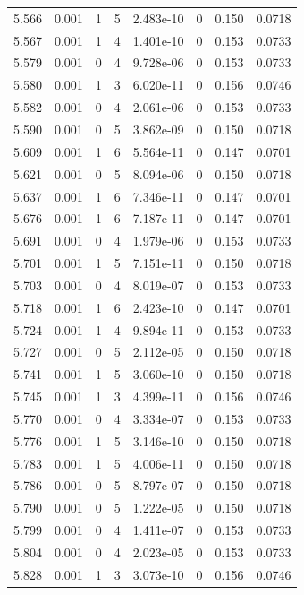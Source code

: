 \documentclass[preview]{standalone}
\begin{document}
{{{{{\begin{tabular}{L{1.2cm}C{1.2cm} C{0.3cm}C{0.5cm} C{1.4cm}C{1.4cm} C{1.4cm}C{1.4cm}}
  5.566  &  0.001  & 1     &  5 &  2.483e-10  & 0  & 0.150 &  0.0718   \\ 
  5.567  &  0.001  & 1     &  4 &  1.401e-10  & 0  & 0.153 &  0.0733   \\ 
  5.579  &  0.001  & 0     &  4 &  9.728e-06  & 0  & 0.153 &  0.0733   \\ 
  5.580  &  0.001  & 1     &  3 &  6.020e-11  & 0  & 0.156 &  0.0746   \\ 
  5.582  &  0.001  & 0     &  4 &  2.061e-06  & 0  & 0.153 &  0.0733   \\ 
  5.590  &  0.001  & 0     &  5 &  3.862e-09  & 0  & 0.150 &  0.0718   \\ 
  5.609  &  0.001  & 1     &  6 &  5.564e-11  & 0  & 0.147 &  0.0701   \\ 
  5.621  &  0.001  & 0     &  5 &  8.094e-06  & 0  & 0.150 &  0.0718   \\ 
  5.637  &  0.001  & 1     &  6 &  7.346e-11  & 0  & 0.147 &  0.0701   \\ 
  5.676  &  0.001  & 1     &  6 &  7.187e-11  & 0  & 0.147 &  0.0701   \\ 
  5.691  &  0.001  & 0     &  4 &  1.979e-06  & 0  & 0.153 &  0.0733   \\ 
  5.701  &  0.001  & 1     &  5 &  7.151e-11  & 0  & 0.150 &  0.0718   \\ 
  5.703  &  0.001  & 0     &  4 &  8.019e-07  & 0  & 0.153 &  0.0733   \\ 
  5.718  &  0.001  & 1     &  6 &  2.423e-10  & 0  & 0.147 &  0.0701   \\ 
  5.724  &  0.001  & 1     &  4 &  9.894e-11  & 0  & 0.153 &  0.0733   \\ 
  5.727  &  0.001  & 0     &  5 &  2.112e-05  & 0  & 0.150 &  0.0718   \\ 
  5.741  &  0.001  & 1     &  5 &  3.060e-10  & 0  & 0.150 &  0.0718   \\ 
  5.745  &  0.001  & 1     &  3 &  4.399e-11  & 0  & 0.156 &  0.0746   \\ 
  5.770  &  0.001  & 0     &  4 &  3.334e-07  & 0  & 0.153 &  0.0733   \\ 
  5.776  &  0.001  & 1     &  5 &  3.146e-10  & 0  & 0.150 &  0.0718   \\ 
  5.783  &  0.001  & 1     &  5 &  4.006e-11  & 0  & 0.150 &  0.0718   \\ 
  5.786  &  0.001  & 0     &  5 &  8.797e-07  & 0  & 0.150 &  0.0718   \\ 
  5.790  &  0.001  & 0     &  5 &  1.222e-05  & 0  & 0.150 &  0.0718   \\ 
  5.799  &  0.001  & 0     &  4 &  1.411e-07  & 0  & 0.153 &  0.0733   \\ 
  5.804  &  0.001  & 0     &  4 &  2.023e-05  & 0  & 0.153 &  0.0733   \\ 
  5.828  &  0.001  & 1     &  3 &  3.073e-10  & 0  & 0.156 &  0.0746   \\ 
\hline 
\end{tabular} 

}}}}}
\end{document}
